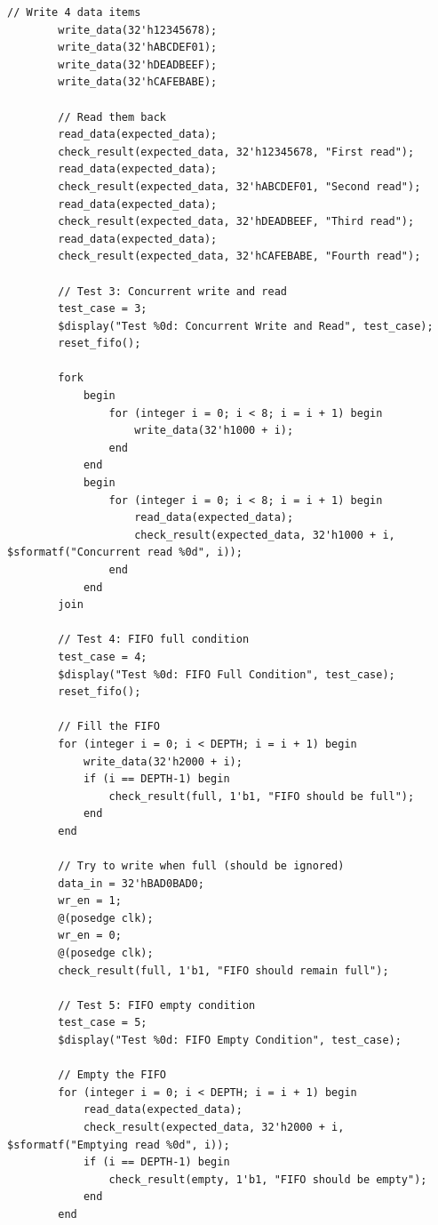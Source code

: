 \documentclass[UTF8]{ctexart}
\begin{document}
\begin{lstlisting}[frame=shadowbox]
        // Write 4 data items
        write_data(32'h12345678);
        write_data(32'hABCDEF01);
        write_data(32'hDEADBEEF);
        write_data(32'hCAFEBABE);
        
        // Read them back
        read_data(expected_data);
        check_result(expected_data, 32'h12345678, "First read");
        read_data(expected_data);
        check_result(expected_data, 32'hABCDEF01, "Second read");
        read_data(expected_data);
        check_result(expected_data, 32'hDEADBEEF, "Third read");
        read_data(expected_data);
        check_result(expected_data, 32'hCAFEBABE, "Fourth read");
        
        // Test 3: Concurrent write and read
        test_case = 3;
        $display("Test %0d: Concurrent Write and Read", test_case);
        reset_fifo();
        
        fork
            begin
                for (integer i = 0; i < 8; i = i + 1) begin
                    write_data(32'h1000 + i);
                end
            end
            begin
                for (integer i = 0; i < 8; i = i + 1) begin
                    read_data(expected_data);
                    check_result(expected_data, 32'h1000 + i, $sformatf("Concurrent read %0d", i));
                end
            end
        join
        
        // Test 4: FIFO full condition
        test_case = 4;
        $display("Test %0d: FIFO Full Condition", test_case);
        reset_fifo();
        
        // Fill the FIFO
        for (integer i = 0; i < DEPTH; i = i + 1) begin
            write_data(32'h2000 + i);
            if (i == DEPTH-1) begin
                check_result(full, 1'b1, "FIFO should be full");
            end
        end
        
        // Try to write when full (should be ignored)
        data_in = 32'hBAD0BAD0;
        wr_en = 1;
        @(posedge clk);
        wr_en = 0;
        @(posedge clk);
        check_result(full, 1'b1, "FIFO should remain full");
        
        // Test 5: FIFO empty condition
        test_case = 5;
        $display("Test %0d: FIFO Empty Condition", test_case);
        
        // Empty the FIFO
        for (integer i = 0; i < DEPTH; i = i + 1) begin
            read_data(expected_data);
            check_result(expected_data, 32'h2000 + i, $sformatf("Emptying read %0d", i));
            if (i == DEPTH-1) begin
                check_result(empty, 1'b1, "FIFO should be empty");
            end
        end
        

\end{lstlisting}
\end{document}
